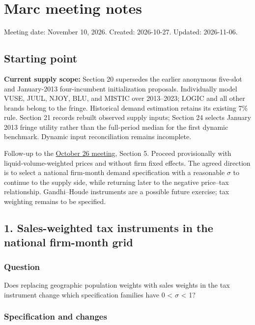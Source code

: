 \documentclass[10pt,]{article}
\date{}
\begin{document}
\section{Marc meeting notes}\label{marc-meeting-notes}

Meeting date: November 10, 2026. Created: 2026-10-27. Updated:
2026-11-06.

\subsection{Starting point}\label{starting-point}

\textbf{Current supply scope:} Section 20 supersedes the earlier
anonymous five-slot and January-2013 four-incumbent initialization
proposals. Individually model VUSE, JUUL, NJOY, BLU, and MISTIC over
2013--2023; LOGIC and all other brands belong to the fringe. Historical
demand estimation retains its existing 7\% rule. Section 21 records
rebuilt observed supply inputs; Section 24 selects January 2013 fringe
utility rather than the full-period median for the first dynamic
benchmark. Dynamic input reconciliation remains incomplete.

Follow-up to the \href{marc_mtg_2026-10-26.md}{October 26 meeting},
Section 5. Proceed provisionally with liquid-volume-weighted prices and
without firm fixed effects. The agreed direction is to select a national
firm-month demand specification with a reasonable \(\sigma\) to continue
to the supply side, while returning later to the negative price--tax
relationship. Gandhi--Houde instruments are a possible future exercise;
tax weighting remains to be specified.

\subsection{1. Sales-weighted tax instruments in the national firm-month
grid}\label{sales-weighted-tax-instruments-in-the-national-firm-month-grid}

\subsubsection{Question}\label{question}

Does replacing geographic population weights with sales weights in the
tax instrument change which specification families have 0 \textless{}
\(\sigma\) \textless{} 1?

\subsubsection{Specification and
changes}\label{specification-and-changes}
\end{document}
